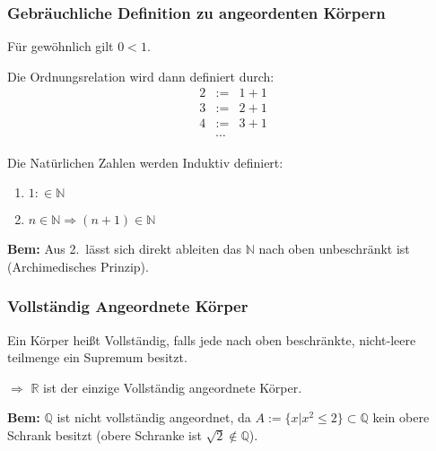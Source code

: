 \documentclass[10pt]{article}
\newcommand{\N}{\mathbb{N}}
\newcommand{\Q}{\mathbb{Q}}
\newcommand{\R}{\mathbb{R}}
\begin{document}
    \subsubsection{Gebräuchliche Definition zu angeordenten Körpern}
    Für gewöhnlich gilt $0<1$.

     Die Ordnungsrelation wird dann definiert durch:
    \begin{eqnarray*}
        2&:=& 1+1 \\
        3&:=& 2+1 \\
        4&:=&3+1 \\
        &\cdots&
    \end{eqnarray*}

     Die Natürlichen Zahlen werden Induktiv definiert:
    \begin{enumerate}
        \item $1 :\in \mathbb{N}$
        \item $n \in \mathbb{N} \Rightarrow (n+1)\in\mathbb{N}$
    \end{enumerate}

    \textbf{Bem:}
    Aus 2.\ lässt sich direkt ableiten das $\N$ nach oben unbeschränkt ist (Archimedisches Prinzip).

    \subsubsection{Vollständig Angeordnete Körper}
    Ein Körper heißt Vollständig, falls jede nach oben beschränkte, nicht-leere
    teilmenge ein Supremum besitzt.

    $\Rightarrow$ $\R$ ist der einzige Vollständig angeordnete Körper.

    \textbf{Bem:} $\Q$ ist nicht vollständig angeordnet, da
    $A := \{x | x^2 \leq 2\} \subset \mathbb{Q}$ kein obere Schrank besitzt
    (obere Schranke ist $\sqrt{2} \notin \mathbb{Q}$).
\end{document}
